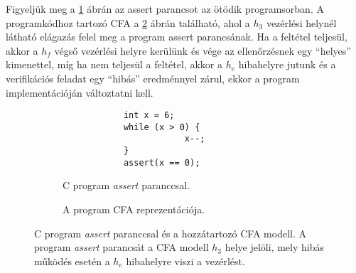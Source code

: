 \begin{example}
	Figyeljük meg a \ref{fig:assert1} ábrán az assert parancsot az ötödik programsorban. A programkódhoz tartozó CFA a \ref{fig:assert2} ábrán található, ahol a $h_3$ vezérlési helynél látható elágazás felel meg a program assert parancsának. Ha a feltétel teljesül, akkor a $h_f$ végső vezérlési helyre kerülünk és vége az ellenőrzésnek egy ``helyes'' kimenettel, míg ha nem teljesül a feltétel, akkor a $h_e$ hibahelyre jutunk és a verifikációs feladat egy ``hibás'' eredménnyel zárul, ekkor a program implementációján változtatni kell.
	\begin{figure}[!htb]
		\begin{subfigure}[b]{.43\linewidth}
			\begin{lstlisting}
			int x = 6;
			while (x > 0) {
						x--;
			}
			assert(x == 0);\end{lstlisting}
			\caption{C program \emph{assert} paranccsal.}
			\label{fig:assert1}		
		\end{subfigure}	
		\hfill
		\begin{subfigure}[b]{.56\linewidth}
			\centering
			\caption{A program CFA reprezentációja.}
			\label{fig:assert2}
		\end{subfigure}
		\caption{C program \emph{assert} paranccsal és a hozzátartozó CFA modell. A program \emph{assert} parancsát a CFA modell $h_3$ helye jelöli, mely hibás működés esetén a $h_e$ hibahelyre viszi a vezérlést.}
		\label{fig:assert}
	\end{figure}
\end{example}


